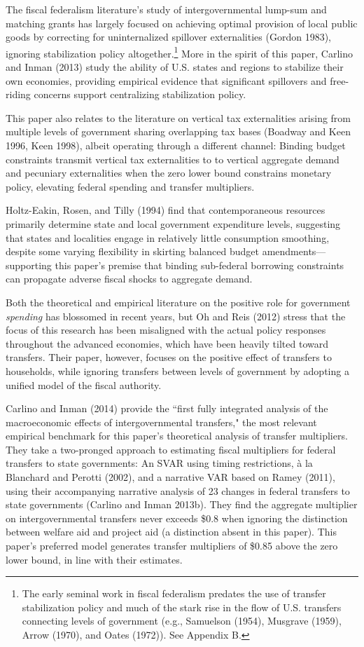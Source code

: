 \documentclass[12pt,letterpaper]{article}
\begin{document}
The fiscal federalism literature's study of intergovernmental lump-sum and matching grants has largely focused on achieving optimal provision of local public goods by correcting for uninternalized spillover externalities (Gordon 1983), ignoring stabilization policy altogether.\footnote{The early seminal work in fiscal federalism predates the use of transfer stabilization policy and much of the stark rise in the flow of U.S. transfers connecting levels of government (e.g., Samuelson (1954), Musgrave (1959), Arrow (1970), and Oates (1972)). See Appendix B.} More in the spirit of this paper, Carlino and Inman (2013) study the ability of U.S. states and regions to stabilize their own economies, providing empirical evidence that significant spillovers and free-riding concerns support centralizing stabilization policy. 

This paper also relates to the literature on vertical tax externalities arising from multiple levels of government sharing overlapping tax bases (Boadway and Keen 1996, Keen 1998), albeit operating through a different channel: Binding budget constraints transmit vertical tax externalities to to vertical aggregate demand and pecuniary externalities when the zero lower bound constrains monetary policy, elevating federal spending and transfer multipliers.

Holtz-Eakin, Rosen, and Tilly (1994) find that contemporaneous resources primarily determine state and local government expenditure levels, suggesting that states and localities engage in relatively little consumption smoothing, despite some varying flexibility in skirting balanced budget amendments---supporting this paper's premise that binding sub-federal borrowing constraints can propagate adverse fiscal shocks to aggregate demand.

Both the theoretical and empirical literature on the positive role for government \textit{spending} has blossomed in recent years, but Oh and Reis (2012) stress that the focus of this research has been misaligned with the actual policy responses throughout the advanced economies, which have been heavily tilted toward transfers. Their paper, however, focuses on the positive effect of transfers to households, while ignoring transfers between levels of government by adopting a unified model of the fiscal authority.

Carlino and Inman (2014) provide the ``first fully integrated analysis of the macroeconomic effects of intergovernmental transfers," the most relevant empirical benchmark for this paper's theoretical analysis of transfer multipliers. They take a two-pronged approach to estimating fiscal multipliers for federal transfers to state governments: An SVAR using timing restrictions, \`a la Blanchard and Perotti (2002), and a narrative VAR based on Ramey (2011), using their accompanying narrative analysis of 23 changes in federal transfers to state governments (Carlino and Inman 2013b). They find the aggregate multiplier on intergovernmental transfers never exceeds \$0.8 when ignoring the distinction between welfare aid and project aid (a distinction absent in this paper). This paper's preferred model generates transfer multipliers of \$0.85 above the zero lower bound, in line with their estimates.
\end{document}
